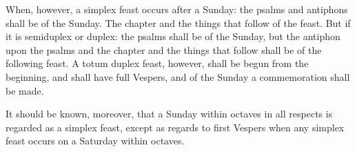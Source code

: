 \documentclass[openany]{book}
\newcommand*\zallmancaps{\fontspec[Weight=Bold]{Merriweather}}
\let\oldlettrine\lettrine
\renewcommand{\lettrine}[3][]{%
	\clubpenalty=10000
	\oldlettrine[#1]{#2}{#3}%
}
\renewcommand{\\}{\par\hspace*{.25em}} %
\renewcommand{\newline}{\par}
\begin{document}
\newline When, however, a simplex feast occurs after a Sunday: the psalms and antiphons shall be of the Sunday. The chapter and the things that follow of the feast. But if it is semiduplex or duplex: the psalms shall be of the Sunday, but the antiphon upon the psalms and the chapter and the things that follow shall be of the following feast. A totum duplex feast, however, shall be begun from the beginning, and shall have full Vespers, and of the Sunday a commemoration shall be made.
\newline It should be known, moreover, that a Sunday within octaves in all respects is regarded as a simplex feast, except as regards to first Vespers when any simplex feast occurs on a Saturday within octaves.

\end{document}
